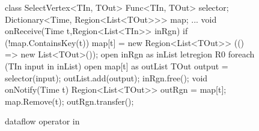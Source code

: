 \begin{figure}[t!]
\begin{numcodejava}
class SelectVertex<TIn, TOut> {
  Func<TIn, TOut> selector;
  Dictionary<Time, Region<List<TOut>>> map;
  ...
  void onReceive(Time t,Region<List<TIn>> inRgn){
    if (!map.ContainsKey(t))
       map[t] = new Region<List<TOut>> (() => new List<TOut>());
    open inRgn as inList {
      letregion R0 {
        foreach (TIn input in inList) {
          open map[t] as outList {
            TOut output = selector(input);
            outList.add(output); } } } }
    inRgn.free();
  }
  void onNotify(Time t) {
     Region<List<TOut>> outRgn = map[t];
     map.Remove(t);
     outRgn.transfer();
  }
}
\end{numcodejava}
\caption{ dataflow operator in \name}
\label{fig:motivating-eg-in-broom}
\vspace*{-0.15in}
\end{figure}
